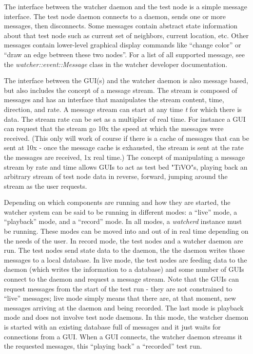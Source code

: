 \documentclass{article}
\begin{document}
The interface between the watcher daemon and the test node is a simple message interface. The test node daemon connects
to a daemon, sends one or more messages, then disconnects. Some messages contain abstract state information about that test node
such as current set of neighbors, current location, etc. Other messages contain lower-level graphical display commands like ``change
color'' or ``draw an edge between these two nodes''.  For a list of all supported message, see the {\it watcher::event::Message} class 
in the watcher developer documentation. 

The interface between the GUI(s) and the watcher daemon is also message based, but also includes the concept of a message
stream. The stream is composed of messages and has an interface that manipulates the stream content, time, direction, and rate. A message
stream can start at any time {\it t} for which there is data. The stream rate can be set as a multiplier of real time. For instance
a GUI can request that the stream go 10x the speed at which the messages were received. (This only will work of course if there is 
a cache of messages that can be sent at 10x - once the message cache is exhausted, the stream is sent at the rate the messages
are received, 1x real time.) The concept of manipulating a message stream by rate and time allows GUIs to act as test bed "TiVO"s, playing 
back an arbitrary stream of test node data in reverse, forward, jumping around the stream as the user requests. 

Depending on which components are running and how they are started, the watcher system can be said to be running in different modes: a ``live'' mode, 
a ``playback'' mode, and a ``record'' mode. In all modes, a {\it watcherd} instance must be running.  These modes
can be moved into and out of in real time depending on the needs of the user. In record mode, the test nodes and a watcher daemon are
run. The test nodes send state data to the daemon, the the daemon writes those messages to a local database. In live mode, the test 
nodes are feeding data to the daemon (which writes the information to a database) and some number of GUIs connect to the 
daemon and request a message stream. Note that the GUIs can request messages from the start of the test run - they are not
constrained to ``live'' messages; live mode simply means that there are, at that moment, new messages arriving at the daemon
and being recorded. The last mode is playback mode and does not involve test node daemons. In this mode, the watcher daemon
is started with an existing database full of messages and it just waits for connections from a GUI. When a GUI connects, the 
watcher daemon streams it the requested messages, this ``playing back'' a ``recorded'' test run. 
\end{document}
